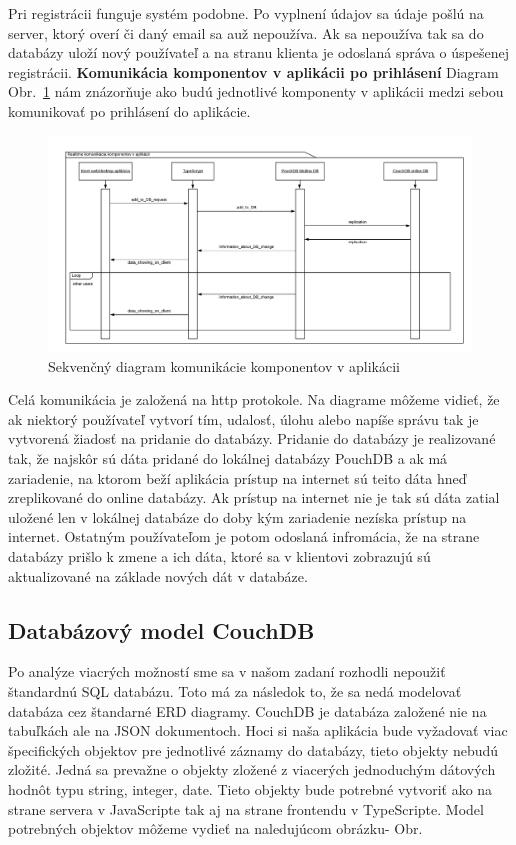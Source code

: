 \indent Pri registrácii funguje systém podobne. Po vyplnení údajov sa údaje pošlú na server, ktorý overí či daný email sa auž nepoužíva. Ak sa nepoužíva tak sa do databázy uloží nový používateľ a na stranu klienta je odoslaná správa o úspešenej registrácii. 
\newpage
\textbf{Komunikácia komponentov v aplikácii po prihlásení} \newline
\indent Diagram Obr.~\ref{fig:seq_com} nám znázorňuje ako budú jednotlivé komponenty v aplikácii medzi sebou komunikovať po prihlásení do aplikácie.
\begin{figure}[H]
    \centering
    \includegraphics[scale=0.50]{img/seq_tim.png}
    \caption{Sekvenčný diagram komunikácie komponentov v aplikácii}
    \label{fig:seq_com}
\end{figure}

\indent Celá komunikácia je založená na http protokole. Na diagrame môžeme vidieť, že ak niektorý používateľ vytvorí tím, udalosť, úlohu alebo napíše správu tak je vytvorená žiadosť na pridanie do databázy. Pridanie do databázy je realizované tak, že najskôr sú dáta pridané do lokálnej databázy PouchDB a ak má zariadenie, na ktorom beží aplikácia prístup na internet sú teito dáta hneď zreplikované do online databázy. Ak prístup na internet nie je tak sú dáta zatial uložené len v lokálnej databáze do doby kým zariadenie nezíska prístup na internet. Ostatným používateľom je potom odoslaná infromácia, že na strane databázy prišlo k zmene a ich dáta, ktoré sa v klientovi zobrazujú sú aktualizované na základe nových dát v databáze.  

\subsection{Databázový model CouchDB}
\indent Po analýze viacrých možností sme sa v našom zadaní rozhodli nepoužiť štandardnú SQL databázu. Toto má za následok to, že sa nedá modelovať databáza cez štandarné ERD diagramy. CouchDB je databáza založené nie na tabuľkách ale na JSON dokumentoch. Hoci si naša aplikácia bude vyžadovať viac špecifických objektov pre jednotlivé záznamy do databázy, tieto objekty nebudú zložité. Jedná sa prevažne o objekty zložené z viacerých jednoduchým dátových hodnôt typu string, integer, date. Tieto objekty bude potrebné vytvoriť ako na strane servera v JavaScripte tak aj na strane frontendu v TypeScripte. Model potrebných objektov môžeme vydieť na naledujúcom obrázku- Obr. 

